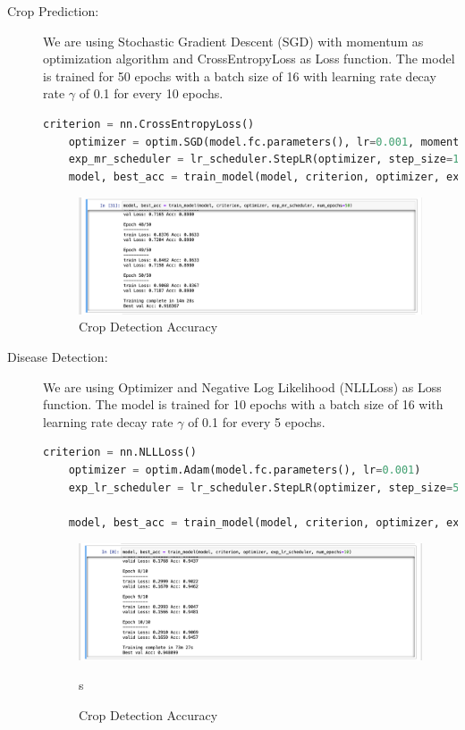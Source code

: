 \documentclass[../Report.tex]{subfiles}
\begin{document}
\begin{description}
  \item[Crop Prediction:] We are using Stochastic Gradient Descent (SGD) with momentum as optimization algorithm and CrossEntropyLoss as 
  Loss function. The model is trained for 50 epochs with a batch size of 16 with learning rate decay rate $\gamma$ of 0.1 for every 10 epochs.

  \begin{lstlisting}[language=python,caption={Disease Detection Image Pre-processing},captionpos=b]
    criterion = nn.CrossEntropyLoss()
    optimizer = optim.SGD(model.fc.parameters(), lr=0.001, momentum=0.9)
    exp_mr_scheduler = lr_scheduler.StepLR(optimizer, step_size=10, gamma=0.1)
    model, best_acc = train_model(model, criterion, optimizer, exp_mr_scheduler, num_epochs=50)
  \end{lstlisting}

  \begin{figure}[H]
    \centering
    \includegraphics[width=\linewidth]{images/crop_acc.png}
    \caption{Crop Detection Accuracy}
    \label{fig:crop_acc}
  \end{figure}

  \item[Disease Detection:] We are using \cite{adam} Optimizer and Negative Log Likelihood (NLLLoss) as Loss function. The model is trained for 
  10 epochs with a batch size of 16 with learning rate decay rate $\gamma$ of 0.1 for every 5 epochs.
  \begin{lstlisting}[language=python,caption={Disease Detection Image Pre-processing},captionpos=b]
    criterion = nn.NLLLoss()
    optimizer = optim.Adam(model.fc.parameters(), lr=0.001)
    exp_lr_scheduler = lr_scheduler.StepLR(optimizer, step_size=5, gamma=0.1)
    
    model, best_acc = train_model(model, criterion, optimizer, exp_lr_scheduler, num_epochs=10) 
  \end{lstlisting}

  \begin{figure}[H]
    \centering
    \includegraphics[width=\linewidth]{images/disease_acc.png}
    \caption{Crop Detection Accuracy}
    \label{fig:disease_acc}s
  \end{figure}


\end{description}
\end{document}
